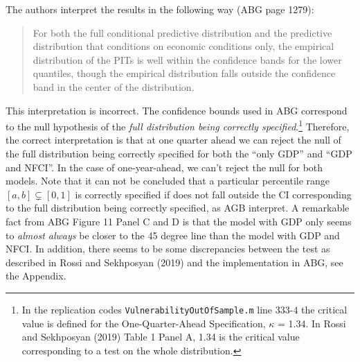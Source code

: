 \documentclass[
  11pt,
]{article}
\begin{document}
The authors interpret the results in the following way (ABG page 1279):

\begin{quote}
For both the full conditional predictive distribution and the predictive
distribution that conditions on economic conditions only, the empirical
distribution of the PITs is well within the confidence bands for the
lower quantiles, though the empirical distribution falls outside the
confidence band in the center of the distribution.
\end{quote}

This interpretation is incorrect. The confidence bounds used in ABG
correspond to the null hypothesis of the
\textit{full distribution being correctly specified}.\footnote{In the replication codes \texttt{VulnerabilityOutOfSample.m} line 333-4 the critical value is defined for the One-Quarter-Ahead Specification, $\kappa$ = 1.34. In Rossi and Sekhposyan (2019) Table 1 Panel A, 1.34 is the critical value corresponding to a test on the whole distribution.}
Therefore, the correct interpretation is that at one quarter ahead we
can reject the null of the full distribution being correctly specified
for both the ``only GDP'' and ``GDP and NFCI''. In the case of
one-year-ahead, we can't reject the null for both models. Note that it
can not be concluded that a particular percentile range
\([a,b] \subsetneq [0,1]\) is correctly specified if does not fall
outside the CI corresponding to the full distribution being correctly
specified, as AGB interpret. A remarkable fact from ABG Figure 11 Panel
C and D is that the model with GDP only seems to \textit{almost always}
be closer to the 45 degree line than the model with GDP and NFCI. In
addition, there seems to be some discrepancies between the test as
described in Rossi and Sekhposyan (2019) and the implementation in ABG,
see the Appendix.
\end{document}
